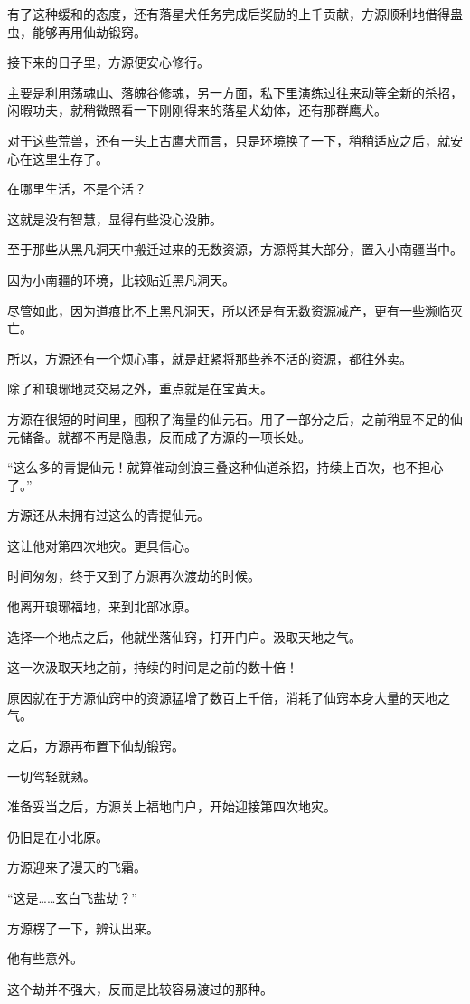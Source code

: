 \begin{this_body}
有了这种缓和的态度，还有落星犬任务完成后奖励的上千贡献，方源顺利地借得蛊虫，能够再用仙劫锻窍。

接下来的日子里，方源便安心修行。

主要是利用荡魂山、落魄谷修魂，另一方面，私下里演练过往来动等全新的杀招，闲暇功夫，就稍微照看一下刚刚得来的落星犬幼体，还有那群鹰犬。

对于这些荒兽，还有一头上古鹰犬而言，只是环境换了一下，稍稍适应之后，就安心在这里生存了。

在哪里生活，不是个活？

这就是没有智慧，显得有些没心没肺。

至于那些从黑凡洞天中搬迁过来的无数资源，方源将其大部分，置入小南疆当中。

因为小南疆的环境，比较贴近黑凡洞天。

尽管如此，因为道痕比不上黑凡洞天，所以还是有无数资源减产，更有一些濒临灭亡。

所以，方源还有一个烦心事，就是赶紧将那些养不活的资源，都往外卖。

除了和琅琊地灵交易之外，重点就是在宝黄天。

方源在很短的时间里，囤积了海量的仙元石。用了一部分之后，之前稍显不足的仙元储备。就都不再是隐患，反而成了方源的一项长处。

“这么多的青提仙元！就算催动剑浪三叠这种仙道杀招，持续上百次，也不担心了。”

方源还从未拥有过这么的青提仙元。

这让他对第四次地灾。更具信心。

时间匆匆，终于又到了方源再次渡劫的时候。

他离开琅琊福地，来到北部冰原。

选择一个地点之后，他就坐落仙窍，打开门户。汲取天地之气。

这一次汲取天地之前，持续的时间是之前的数十倍！

原因就在于方源仙窍中的资源猛增了数百上千倍，消耗了仙窍本身大量的天地之气。

之后，方源再布置下仙劫锻窍。

一切驾轻就熟。

准备妥当之后，方源关上福地门户，开始迎接第四次地灾。

仍旧是在小北原。

方源迎来了漫天的飞霜。

“这是……玄白飞盐劫？”

方源楞了一下，辨认出来。

他有些意外。

这个劫并不强大，反而是比较容易渡过的那种。


\end{this_body}
